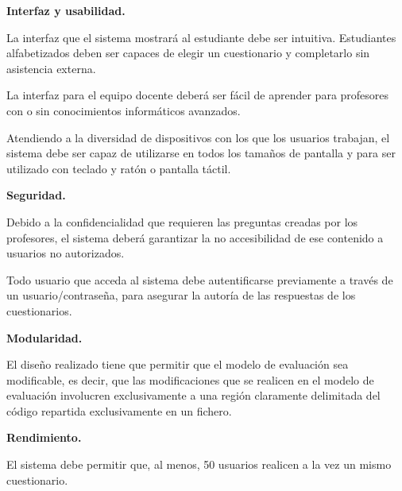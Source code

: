 \begin{rnf0}
	\item \textbf{Interfaz y usabilidad.}
		\begin{rnf0*}
			\item La interfaz que el sistema mostrará al estudiante debe ser intuitiva. Estudiantes alfabetizados deben ser capaces de elegir un cuestionario y completarlo sin asistencia externa. %
			\item La interfaz para el equipo docente deberá ser fácil de aprender para profesores con o sin conocimientos informáticos avanzados. 
			\item Atendiendo a la diversidad de dispositivos con los que los usuarios trabajan, el sistema debe ser capaz de utilizarse en todos los tamaños de pantalla y para ser utilizado con teclado y ratón o pantalla táctil.
		\end{rnf0*}
	\item \textbf{Seguridad.}
		\begin{rnf0*}
			\item Debido a la confidencialidad que requieren las preguntas creadas por los profesores, el sistema deberá garantizar la no accesibilidad de ese contenido a usuarios no autorizados.
			\item Todo usuario que acceda al sistema debe autentificarse previamente a través de un usuario/contraseña, para asegurar la autoría de las respuestas de los cuestionarios.
		\end{rnf0*}
	\item \textbf{Modularidad.}
		\begin{rnf0*}
			\item El diseño realizado tiene que permitir que el modelo de evaluación sea modificable, es decir, que las modificaciones que se realicen en el modelo de evaluación involucren exclusivamente a una región claramente delimitada del código repartida exclusivamente en un fichero. \label{RNF:mofularidad}
		\end{rnf0*}
	\item \textbf{Rendimiento.}
		\begin{rnf0*}
			\item El sistema debe permitir que, al menos, 50 usuarios realicen a la vez un mismo cuestionario.
		\end{rnf0*}
\end{rnf0}


